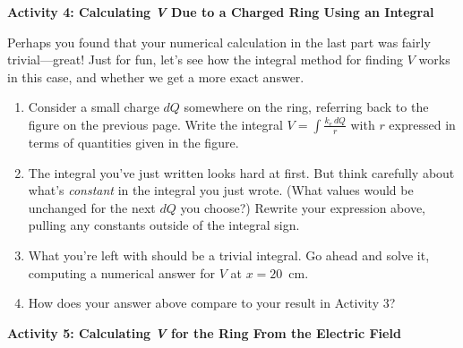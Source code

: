 \pagebreak[2]
\textbf{Activity 4: Calculating \textit{V} Due to a Charged Ring Using an Integral}

Perhaps you found that your numerical calculation in the last part was fairly trivial---great!  Just for fun, let's see how the integral method for finding $V$ works in this case, and whether we get a more exact answer.

\begin{enumerate}[labparts]

\item Consider a small charge $dQ$ somewhere on the ring, referring back to the figure on the previous page.  Write the integral  
$\displaystyle V=\int{\frac{k_e\,dQ}{r}}$
with $r$ expressed in terms of quantities given in the figure.
\answerspace{0.6in}

\item The integral you've just written looks hard at first.  But think carefully about what's \textit{constant} in the integral you just wrote.  (What values would be unchanged for the next $dQ$ you choose?)  Rewrite your expression above, pulling any constants outside of the integral sign.
\answerspace{0.5in}

\item What you're left with should be a trivial integral.  Go ahead and solve it, computing a numerical answer for $V$ at $x = 20$~cm.
\answerspace{0.7in}


\item How does your answer above compare to your result in Activity 3?
\answerspace{0.3in}
\end{enumerate}

\textbf{Activity 5: Calculating \textit{V} for the Ring From the Electric Field}

\bigskip

